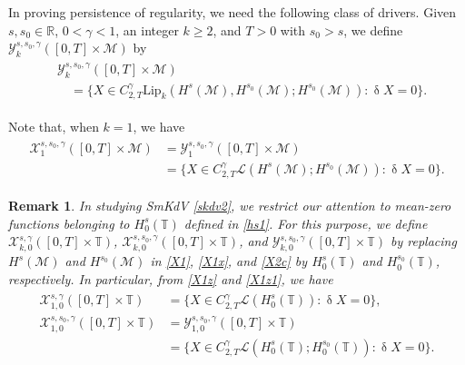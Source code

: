 \documentclass[letterpaper, 11pt,  reqno]{amsart}
\newtheorem{remark}[theorem]{Remark}
\newcommand{\1}{\hspace{0.5mm}\textup{I}\hspace{0.5mm}}
\newcommand{\noi}{\noindent}
\newcommand{\R}{\mathbb{R}}
\newcommand{\T}{\mathbb{T}}
\renewcommand{\L}{\mathcal{L}}
\newcommand{\updl}{\updelta}
\newcommand{\g}{\gamma}
\newcommand{\M}{\mathcal{M}}
\newcommand{\cX}{\mathcal{X}}
\newcommand{\cY}{\mathcal{Y}}
\newcommand{\Lip}{\mathrm{Lip}}
\numberwithin{equation}{section}
\numberwithin{theorem}{section}
\begin{document}
\noi
In proving persistence of regularity, we need the following
class of drivers.
Given $s, s_0 \in \R$, $0 < \g < 1$,  
an integer $k \ge 2$,
 and $T > 0$
with $s_0 > s$, we define 
$\cY^{s, s_0, \g}_{k}([0, T]\times\M)$ by 
\begin{align}
\begin{split}
& \cY^{s, s_0, \g}_k ([0, T]\times \M) \\
& \quad = 
\big\{ X \in 
  C^\g_{2, T} \Lip_k(H^s(\M), H^{s_0}(\M);H^{s_0}(\M)): 
  \updl X = 0\big\}.
\end{split}
\label{X2c}
\end{align}

\noi
Note that, when $k = 1$, we have 
\begin{align}
\begin{split}
 \cX^{s, s_0, \g}_1 ([0, T]\times \M) 
&  = \cY^{s, s_0, \g}_1 ([0, T]\times \M) \\
& =  \big\{ X \in 
C^\g_{2, T} \L(H^s(\M); H^{s_0}(\M)):
\updl X = 0\big\}.
\end{split}
\label{X1z1}
\end{align}




\begin{remark}\label{REM:m0}\rm
In studying SmKdV \eqref{skdv2}, 
we restrict our attention to mean-zero functions
belonging to $H^s_0(\T)$ defined in \eqref{hs1}.
For this purpose, we define 
$\cX^{s, \g}_{k, 0} ([0, T]\times \T) $, 
$\cX^{s, s_0, \g}_{k, 0} ([0, T]\times \T) $, 
and 
$\cY^{s, s_0, \g}_{k, 0}([0, T]\times\T)$ 
by replacing $H^s(\M)$ and 
$H^{s_0}(\M)$ in \eqref{X1}, \eqref{X1x}, and \eqref{X2c}
by 
$H^s_0(\T)$ and 
$H^{s_0}_0(\T)$, respectively.
In particular, from \eqref{X1z} and \eqref{X1z1}, we have
\begin{align}
\begin{split}
 \cX^{s, \g}_{1, 0} ([0, T]\times \T) 
& =  \big\{ X \in 
C^\g_{2, T} \L(H^s_0(\T)):
\updl X = 0\big\}, \\
 \cX^{s, s_0, \g}_{1, 0} ([0, T]\times \T) 
 & =  \cY^{s, s_0, \g}_{1, 0} ([0, T]\times \T) \\
& =  \big\{ X \in 
C^\g_{2, T} \L(H_0^s(\T); H_0^{s_0}(\T)):
\updl X = 0\big\}.
\end{split}
\label{X1y}
\end{align}



\end{remark}
\end{document}
